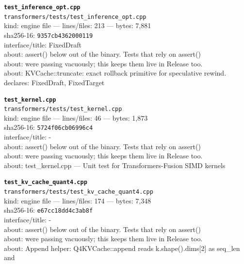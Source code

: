 \noindent\textbf{\texttt{test\_inference\_opt.cpp}}\\
\texttt{transformers/tests/test\_inference\_opt.cpp}\\
kind: engine file --- lines/files: 213 --- bytes: 7,881\\
sha256-16: \texttt{9357cb4362000119}\\
interface/title: FixedDraft\\
about: assert() below out of the binary. Tests that rely on assert()\\
about: were passing vacuously; this keeps them live in Release too.\\
about: KVCache::truncate: exact rollback primitive for speculative rewind.\\
declares: FixedDraft, FixedTarget\\
\vspace*{6.0pt}

\noindent\textbf{\texttt{test\_kernel.cpp}}\\
\texttt{transformers/tests/test\_kernel.cpp}\\
kind: engine file --- lines/files: 46 --- bytes: 1,873\\
sha256-16: \texttt{5724f06cb06996c4}\\
interface/title: -\\
about: assert() below out of the binary. Tests that rely on assert()\\
about: were passing vacuously; this keeps them live in Release too.\\
about: test\_kernel.cpp — Unit test for Transformers-Fusion SIMD kernels\\
\vspace*{6.0pt}

\noindent\textbf{\texttt{test\_kv\_cache\_quant4.cpp}}\\
\texttt{transformers/tests/test\_kv\_cache\_quant4.cpp}\\
kind: engine file --- lines/files: 174 --- bytes: 7,348\\
sha256-16: \texttt{e67cc18dd4c3ab8f}\\
interface/title: -\\
about: assert() below out of the binary. Tests that rely on assert()\\
about: were passing vacuously; this keeps them live in Release too.\\
about: Append helper: Q4KVCache::append reads k.shape().dims[2] as seq\_len and\\
\vspace*{6.0pt}

